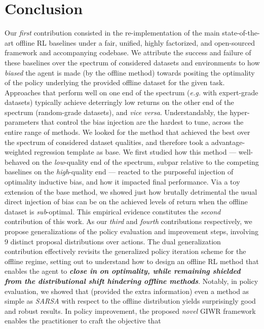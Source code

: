 \section{Conclusion}
Our \emph{first} contribution consisted in the re-implementation of the main state-of-the-art offline RL
baselines under a fair, unified, highly factorized, and open-sourced framework and accompanying codebase.
We attribute the success and failure of these baselines over the spectrum of considered datasets and environments
to how \emph{biased} the agent is made (by the offline method)
towards positing the optimality of the policy underlying the provided
offline dataset for the given task.
Approaches that perform well on one end of the spectrum (\textit{e.g.} with expert-grade datasets)
typically achieve deterringly low returns on the other end of the spectrum (random-grade datasets),
and \textit{vice versa}.
Understandably, the hyper-parameters that control the bias injection are the hardest to tune,
across the entire range of methods.
We looked for the method that achieved the best over the spectrum of considered dataset qualities,
and therefore took a advantage-weighted regression template as base.
We first studied how this method --- well-behaved on the \textit{low}-quality end of the spectrum,
subpar relative to the competing baselines on the \textit{high}-quality end ---
reacted to the purposeful injection of optimality inductive bias, and how it impacted final performance.
Via a toy extension of the base method, we showed just how brutally detrimental
the usual direct injection of bias can be on the achieved levels of return when the offline dataset
is \textit{sub}-optimal.
This empirical evidence constitutes the \emph{second} contribution of this work.
As our \emph{third} and \emph{fourth} contributions respectively,
we propose generalizations of the policy evaluation and improvement steps,
involving 9 distinct proposal distributions over actions.
The dual generalization contribution effectively revisits the generalized policy iteration
scheme for the offline regime, setting out to understand how to design an offline RL method that
enables the agent to \textbf{\emph{close in on optimality, while remaining shielded from the
distributional shift hindering offline methods}}.
Notably, in policy evaluation, we showed that (provided the extra information) even a method as simple
as \textit{SARSA} with respect to the offline distribution yields surprisingly good and
robust results.
In policy improvement, the proposed \emph{novel} GIWR framework enables the practitioner to craft the objective that
